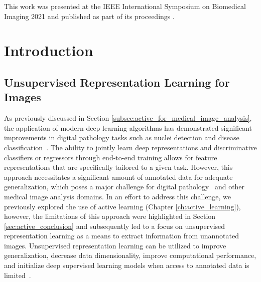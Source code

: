 This work was presented at the IEEE International Symposium on Biomedical Imaging 2021 and published as part of its proceedings \citep{carse2021unsupervised}.



\section{Introduction}
\label{sec:unsupervised_intro}
\subsection{Unsupervised Representation Learning for Images}
\label{subsec:unsupervised_for_medical}
As previously discussed in Section \ref{subsec:active_for_medical_image_analysis}, the application of modern deep learning algorithms has demonstrated significant improvements in digital pathology tasks such as nuclei detection and disease classification~\citep{litjens2017survey}. The ability to jointly learn deep representations and discriminative classifiers or regressors through end-to-end training allows for feature representations that are specifically tailored to a given task. However, this approach necessitates a significant amount of annotated data for adequate generalization, which poses a major challenge for digital pathology~\citep{madabhushi2016image} and other medical image analysis domains. In an effort to address this challenge, we previously explored the use of active learning (Chapter \ref{ch:active_learning}), however, the limitations of this approach were highlighted in Section \ref{sec:active_conclusion} and subsequently led to a focus on unsupervised representation learning as a means to extract information from unannotated images. Unsupervised representation learning can be utilized to improve generalization, decrease data dimensionality, improve computational performance, and initialize deep supervised learning models when access to annotated data is limited~\citep{bengio2013representation}.

